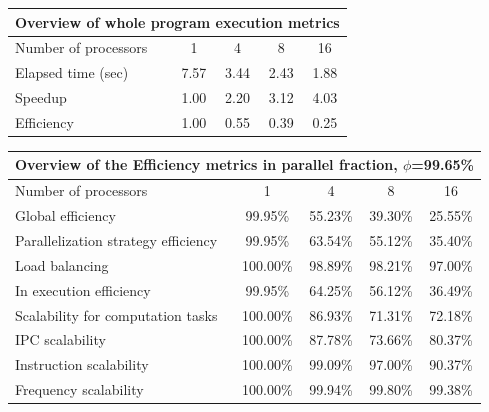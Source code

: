 \begin{tabular}{|l|c|c|c|c|}
\hline
\multicolumn{5}{|c|}{Overview of whole program execution metrics} \\
\hline
\hline
Number of processors & 1 & 4 & 8 & 16 \\
\hline
Elapsed time (sec)      &       7.57 &       3.44 &       2.43 &       1.88 \\
\hline
Speedup                 &       1.00 &       2.20 &       3.12 &       4.03 \\
\hline
Efficiency              &       1.00 &       0.55 &       0.39 &       0.25 \\
\hline
\end{tabular}
\vspace{2mm}
\begin{tabular}{|l|c|c|c|c|}
\hline
\multicolumn{5}{|c|}{Overview of the Efficiency metrics in parallel fraction, $\phi$=99.65\%} \\
\hline
\hline
Number of processors & 1 & 4 & 8 & 16 \\
\hline
\hline
Global efficiency                      &     99.95\% &     55.23\% &     39.30\% &     25.55\% \\
\hline
\hline
Parallelization strategy efficiency &     99.95\% &     63.54\% &     55.12\% &     35.40\% \\
\hline
Load balancing                   &    100.00\% &     98.89\% &     98.21\% &     97.00\% \\
In execution efficiency          &     99.95\% &     64.25\% &     56.12\% &     36.49\% \\
\hline
\hline
Scalability for computation tasks   &    100.00\% &     86.93\% &     71.31\% &     72.18\% \\
\hline
IPC scalability                  &    100.00\% &     87.78\% &     73.66\% &     80.37\% \\
Instruction scalability          &    100.00\% &     99.09\% &     97.00\% &     90.37\% \\
Frequency scalability            &    100.00\% &     99.94\% &     99.80\% &     99.38\% \\
\hline
\end{tabular}
\vspace{2mm}
